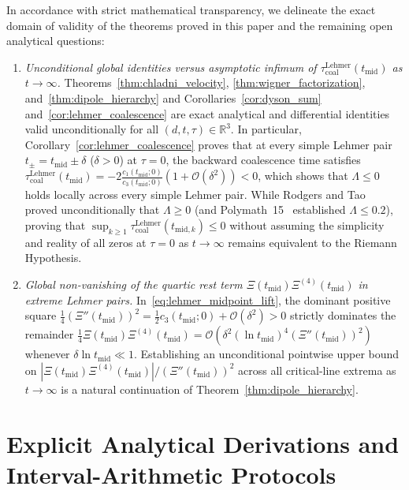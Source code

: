 \documentclass[11pt,reqno]{amsart}
\theoremstyle{definition}
\theoremstyle{remark}
\numberwithin{equation}{section}
\newcommand{\R}{\mathbb{R}}
\begin{document}
In accordance with strict mathematical transparency, we delineate the exact domain of validity of the theorems proved in this paper and the remaining open analytical questions:
\begin{enumerate}[label=\textup{(\arabic*)},leftmargin=2.2em]
\item \textit{Unconditional global identities versus asymptotic infimum of $\tau_{\mathrm{coal}}^{\mathrm{Lehmer}}(t_{\mathrm{mid}})$ as $t \to \infty$.} Theorems~\ref{thm:chladni_velocity}, \ref{thm:wigner_factorization}, and~\ref{thm:dipole_hierarchy} and Corollaries~\ref{cor:dyson_sum} and~\ref{cor:lehmer_coalescence} are exact analytical and differential identities valid unconditionally for all $(d, t, \tau) \in \R^3$. In particular, Corollary~\ref{cor:lehmer_coalescence} proves that at every simple Lehmer pair $t_\pm = t_{\mathrm{mid}} \pm \delta$ ($\delta > 0$) at $\tau = 0$, the backward coalescence time satisfies $\tau_{\mathrm{coal}}^{\mathrm{Lehmer}}(t_{\mathrm{mid}}) = -2\frac{c_1(t_{\mathrm{mid}};0)}{c_3(t_{\mathrm{mid}};0)}(1+\mathcal{O}(\delta^2)) < 0$, which shows that $\Lambda \le 0$ holds locally across every simple Lehmer pair. While Rodgers and Tao~\cite{rodgerstao2020} proved unconditionally that $\Lambda \ge 0$ (and Polymath~15~\cite{polymath2019} established $\Lambda \le 0.2$), proving that $\sup_{k \ge 1} \tau_{\mathrm{coal}}^{\mathrm{Lehmer}}(t_{\mathrm{mid},k}) \le 0$ without assuming the simplicity and reality of all zeros at $\tau = 0$ as $t \to \infty$ remains equivalent to the Riemann Hypothesis.
\item \textit{Global non-vanishing of the quartic rest term $\Xi(t_{\mathrm{mid}})\Xi^{(4)}(t_{\mathrm{mid}})$ in extreme Lehmer pairs.} In~\eqref{eq:lehmer_midpoint_lift}, the dominant positive square $\frac{1}{4}(\Xi''(t_{\mathrm{mid}}))^2 = \frac{1}{2}c_3(t_{\mathrm{mid}};0) + \mathcal{O}(\delta^2) > 0$ strictly dominates the remainder $\frac{1}{4}\Xi(t_{\mathrm{mid}})\Xi^{(4)}(t_{\mathrm{mid}}) = \mathcal{O}(\delta^2(\ln t_{\mathrm{mid}})^4(\Xi''(t_{\mathrm{mid}}))^2)$ whenever $\delta\ln t_{\mathrm{mid}} \ll 1$. Establishing an unconditional pointwise upper bound on $|\Xi(t_{\mathrm{mid}})\Xi^{(4)}(t_{\mathrm{mid}})|/(\Xi''(t_{\mathrm{mid}}))^2$ across all critical-line extrema as $t \to \infty$ is a natural continuation of Theorem~\ref{thm:dipole_hierarchy}.
\end{enumerate}

\appendix

\section{Explicit Analytical Derivations and Interval-Arithmetic Protocols}\label{app:derivations}
\end{document}
